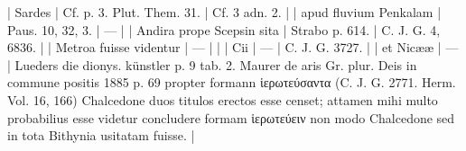 \documentclass[a4paper, 11pt, oneside, polutonikogreek, german]{article}
\begin{document}
| Sardes                                                   | Cf. p. 3. Plut. Them. 31.          | Cf. 3 adn. 2.                                                                                                                                                                                                                                                                                                                                  |
| apud fluvium Penkalam                                    | Paus. 10, 32, 3.                   | ---                                                                                                                                                                                                                                                                                                                                            |
| Andira prope Scepsin sita                                | Strabo p. 614.                     | C. J. G. 4, 6836.                                                                                                                                                                                                                                                                                                                              |
| Metroa fuisse videntur                                   | ---                                |                                                                                                                                                                                                                                                                                                                                                |
| Cii                                                      | ---                                | C. J. G. 3727.                                                                                                                                                                                                                                                                                                                                 |
| et Nicææ                                                 | ---                                | Lueders die dionys. künstler p. 9 tab. 2. Maurer de aris Gr. plur. Deis in commune positis 1885 p. 69 propter formann ἱερωτεύσαντα (C. J. G. 2771. Herm. Vol. 16, 166) Chalcedone duos titulos erectos esse censet; attamen mihi multo probabilius esse videtur concludere formam ἱερωτεύειν non modo Chalcedone sed in tota Bithynia usitatam fuisse. |
\end{document}

